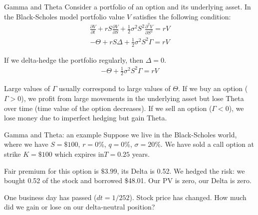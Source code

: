 \documentclass{beamer}
\begin{document}
\begin{frame}{Gamma and Theta}
\justify
Consider a portfolio of an option and its underlying asset. In the Black-Scholes model portfolio value $V$ satisfies the following condition:
\begin{align*}
\frac{\partial V}{\partial t} + rS\frac{\partial V}{\partial S} + \frac{1}{2}\sigma^2S^2\frac{\partial^2 V}{\partial S^2} = rV
\end{align*}
\begin{align*}
-\Theta + rS\Delta + \frac{1}{2}\sigma^2S^2\Gamma = rV
\end{align*}

If we delta-hedge the portfolio regularly, then $\Delta=0$.
\begin{align*}
-\Theta + \frac{1}{2}\sigma^2S^2\Gamma = rV
\end{align*}

\justify
Large values of $\Gamma$ usually correspond to large values of $\Theta$. If we buy an option ($\Gamma > 0$), we profit from large movements in the underlying asset but lose Theta over time (time value of the option decreases). If we sell an option ($\Gamma < 0$), we lose money due to imperfect hedging but gain Theta.
\end{frame}



\begin{frame}{Gamma and Theta: an example}
\justify
Suppose we live in the Black-Scholes world, where we have $S=\$100$, $r=0\%$, $q=0\%$, $\sigma=20\%$. We have \alert{sold} a call option at strike $K=\$100$ which expires in$T=0.25$  years.

\justify
Fair premium for this option is $\$3.99$, its Delta is 0.52. We hedged the risk: we bought 0.52 of the stock and borrowed \$48.01. Our PV is zero, our Delta is zero.

\justify
One business day has passed ($dt = 1/252$). Stock price has changed. How much did we gain or lose on our delta-neutral position?
\end{frame}
\end{document}
